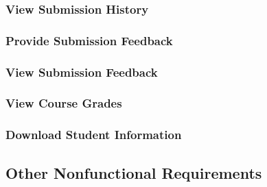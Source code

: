 \documentclass{article}
\begin{document}
\subsubsection{View Submission History}

\subsubsection{Provide Submission Feedback}

\subsubsection{View Submission Feedback}

\subsubsection{View Course Grades}



\subsubsection{Download Student Information}

\subsection{Other Nonfunctional Requirements}





\end{document}
